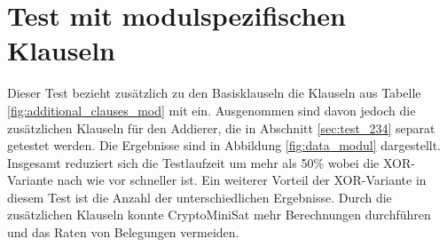 \section{Test mit modulspezifischen Klauseln} %
\label{sec:test_modul}

Dieser Test bezieht zusätzlich zu den Basisklauseln die Klauseln aus Tabelle \ref{fig:additional_clauses_mod} mit ein.
Ausgenommen sind davon jedoch die zusätzlichen Klauseln für den Addierer, die in Abschnitt \ref{sec:test_234} separat getestet werden.
Die Ergebnisse sind in Abbildung \ref{fig:data_modul} dargestellt.
Insgesamt reduziert sich die Testlaufzeit um mehr als 50\% wobei die XOR-Variante nach wie vor schneller ist.
Ein weiterer Vorteil der XOR-Variante in diesem Test ist die Anzahl der unterschiedlichen Ergebnisse. Durch die
zusätzlichen Klauseln konnte CryptoMiniSat mehr Berechnungen durchführen und das Raten von Belegungen vermeiden.
